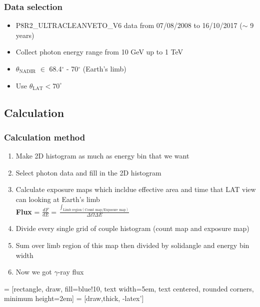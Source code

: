 \documentclass{beamer}
\begin{document}
\begin{frame}
\frametitle{Data selection}
\begin{itemize}
  \item P8R2\_ULTRACLEANVETO\_V6 data from 07/08/2008 to 16/10/2017 ($\sim$ 9 years) %
  \item Collect photon energy range from 10 GeV up to 1 TeV
  \item $\theta_{\text{NADIR}}$ $\in$ 68.4$^\circ$  - 70$^\circ$ (Earth's limb)
  \item Use $\theta_{\text{LAT}} < 70^\circ$
\end{itemize}
\end{frame}
\subsection{Calculation}
\begin{frame}
\frametitle{Calculation method}
\begin{enumerate}
  \item Make 2D histogram as much as energy bin that we want
  \item Select photon data and fill in the 2D histogram
  \item Calculate exposure maps which incldue effective area
  and time that LAT view can looking at Earth's limb
  \\ \textbf{Flux} = $\frac{dF}{dE} = \frac{\int_{\text{Limb region}(\text{Count map}/\text{Exposure map})}}{\Delta\Omega\Delta E }$
  \item Divide every single grid of couple histogram (count map and exposure map)
  \item Sum over limb region of this map then divided by solidangle and energy bin width
  \item Now we got $\gamma$-ray flux
\end{enumerate}
\end{frame}


   = [rectangle, draw, fill=blue!10, 
  text width=5em, text centered, rounded corners, minimum height=2em]
   = [draw,thick, -latex']
\end{document}
